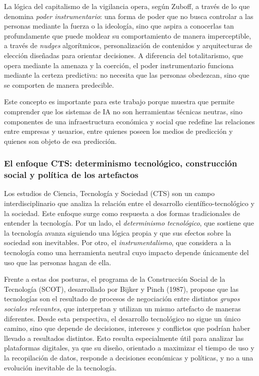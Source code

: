 \documentclass[11pt,a4paper]{article}
\begin{document}
La lógica del capitalismo de la vigilancia opera, según Zuboff, a través de lo que denomina \textit{poder instrumentario}: una forma de poder que no busca controlar a las personas mediante la fuerza o la ideología, sino que aspira a conocerlas tan profundamente que puede moldear su comportamiento de manera imperceptible, a través de \textit{nudges} algorítmicos, personalización de contenidos y arquitecturas de elección diseñadas para orientar decisiones. A diferencia del totalitarismo, que opera mediante la amenaza y la coerción, el poder instrumentario funciona mediante la certeza predictiva: no necesita que las personas obedezcan, sino que se comporten de manera predecible.

Este concepto es importante para este trabajo porque muestra que permite comprender que los sistemas de IA no son herramientas técnicas neutras, sino componentes de una infraestructura económica y social que redefine las relaciones entre empresas y usuarios, entre quienes poseen los medios de predicción y quienes son objeto de esa predicción.

\subsubsection{El enfoque CTS: determinismo tecnológico, construcción social y política de los artefactos}

Los estudios de Ciencia, Tecnología y Sociedad (CTS) son un campo interdisciplinario que analiza la relación entre el desarrollo científico-tecnológico y la sociedad. Este enfoque surge como respuesta a dos formas tradicionales de entender la tecnología. Por un lado, el \textit{determinismo tecnológico}, que sostiene que la tecnología avanza siguiendo una lógica propia y que sus efectos sobre la sociedad son inevitables. Por otro, el \textit{instrumentalismo}, que considera a la tecnología como una herramienta neutral cuyo impacto depende únicamente del uso que las personas hagan de ella.

Frente a estas dos posturas, el programa de la Construcción Social de la Tecnología (SCOT), desarrollado por Bijker y Pinch (1987), propone que las tecnologías son el resultado de procesos de negociación entre distintos \textit{grupos sociales relevantes}, que interpretan y utilizan un mismo artefacto de maneras diferentes. Desde esta perspectiva, el desarrollo tecnológico no sigue un único camino, sino que depende de decisiones, intereses y conflictos que podrían haber llevado a resultados distintos. Esto resulta especialmente útil para analizar las plataformas digitales, ya que su diseño, orientado a maximizar el tiempo de uso y la recopilación de datos, responde a decisiones económicas y políticas, y no a una evolución inevitable de la tecnología.
\end{document}
